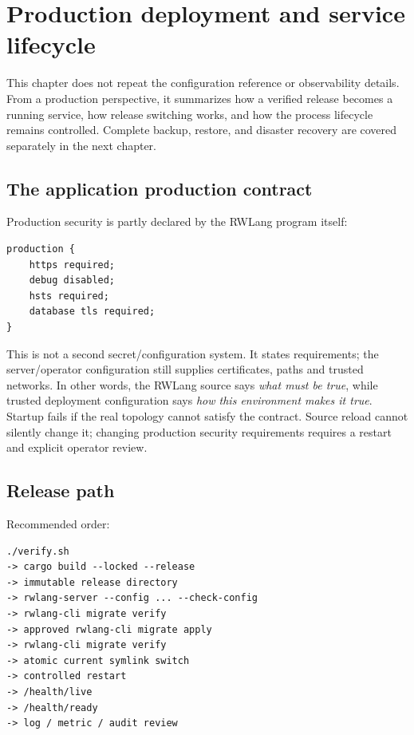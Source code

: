 \chapter{Production deployment and service lifecycle}

This chapter does not repeat the configuration reference or observability details. From a production perspective, it summarizes how a verified release becomes a running service, how release switching works, and how the process lifecycle remains controlled. Complete backup, restore, and disaster recovery are covered separately in the next chapter.

\section{The application production contract}

Production security is partly declared by the RWLang program itself:

\begin{lstlisting}[language=RWLang]
production {
    https required;
    debug disabled;
    hsts required;
    database tls required;
}
\end{lstlisting}

This is not a second secret/configuration system. It states requirements; the server/operator configuration still supplies certificates, paths and trusted networks. In other words, the RWLang source says \emph{what must be true}, while trusted deployment configuration says \emph{how this environment makes it true}. Startup fails if the real topology cannot satisfy the contract. Source reload cannot silently change it; changing production security requirements requires a restart and explicit operator review.

\section{Release path}

Recommended order:

\begin{lstlisting}
./verify.sh
-> cargo build --locked --release
-> immutable release directory
-> rwlang-server --config ... --check-config
-> rwlang-cli migrate verify
-> approved rwlang-cli migrate apply
-> rwlang-cli migrate verify
-> atomic current symlink switch
-> controlled restart
-> /health/live
-> /health/ready
-> log / metric / audit review
\end{lstlisting}

